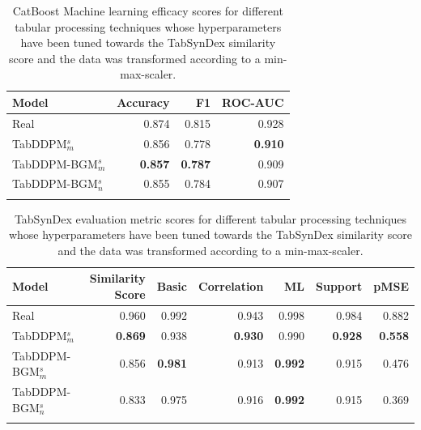 \begin{table}[h]
	\centering
	\begin{tabular}{lrrr}
		\toprule
		\textbf{Model}        & \textbf{Accuracy} & \textbf{F1}    & \textbf{ROC-AUC} \\
		\midrule
		Real                  & 0.874              & 0.815          & 0.928            \\
		TabDDPM$^{s}_{m}$     & 0.856              & 0.778          & \textbf{0.910}   \\
		TabDDPM-BGM$^{s}_{m}$ & \textbf{0.857}     & \textbf{0.787} & 0.909            \\
		TabDDPM-BGM$^{s}_{n}$ & 0.855              & 0.784          & 0.907            \\
		\bottomrule
		\multicolumn{4}{c}{}\\[-0.6em]
	\end{tabular}
	\caption[Experiment 3 ML efficacy]{CatBoost Machine learning efficacy scores for different tabular processing techniques whose hyperparameters have been tuned towards the TabSynDex similarity score
		and the data was transformed according to a min-max-scaler.}
	\label{tab:exp3-ml}
\end{table}

\begin{table}[h]
	\centering
	\begin{tabular}{lrrrrrr}
		\toprule
		\textbf{Model}        & \textbf{Similarity Score} & \textbf{Basic} & \textbf{Correlation} & \textbf{ML}    & \textbf{Support} & \textbf{pMSE}  \\
		\midrule
		Real                  & 0.960                     & 0.992          & 0.943                & 0.998          & 0.984            & 0.882          \\
		TabDDPM$^{s}_{m}$     & \textbf{0.869}            & 0.938          & \textbf{0.930}       & 0.990          & \textbf{0.928}   & \textbf{0.558} \\
		TabDDPM-BGM$^{s}_{m}$ & 0.856                     & \textbf{0.981} & 0.913                & \textbf{0.992} & 0.915            & 0.476          \\
		TabDDPM-BGM$^{s}_{n}$ & 0.833                     & 0.975          & 0.916                & \textbf{0.992} & 0.915            & 0.369          \\
		\bottomrule
		\multicolumn{7}{c}{}\\[-0.6em]
	\end{tabular}
	\caption[Experiment 3 TabSynDex]{TabSynDex evaluation metric scores for different tabular processing techniques whose hyperparameters have been tuned towards the TabSynDex similarity score
		and the data was transformed according to a min-max-scaler.}
	\label{tab:exp3-sim}
\end{table}

